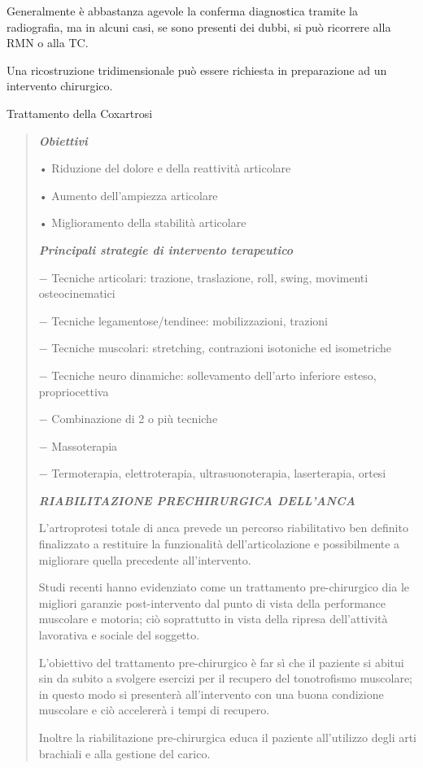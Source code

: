 \documentclass[]{article}
\begin{document}
Generalmente è abbastanza agevole la conferma diagnostica tramite la
radiografia, ma in alcuni casi, se sono presenti dei dubbi, si può
ricorrere alla RMN o alla TC.

Una ricostruzione tridimensionale può essere richiesta in preparazione
ad un intervento chirurgico.

Trattamento della Coxartrosi

\begin{quote}
\textbf{\emph{Obiettivi}}

• Riduzione del dolore e della reattività articolare

• Aumento dell'ampiezza articolare

• Miglioramento della stabilità articolare

\textbf{\emph{Principali strategie di intervento terapeutico}}

− Tecniche articolari: trazione, traslazione, roll, swing, movimenti
osteocinematici

− Tecniche legamentose/tendinee: mobilizzazioni, trazioni

− Tecniche muscolari: stretching, contrazioni isotoniche ed isometriche

− Tecniche neuro dinamiche: sollevamento dell'arto inferiore esteso,
propriocettiva

− Combinazione di 2 o più tecniche

− Massoterapia

− Termoterapia, elettroterapia, ultrasuonoterapia, laserterapia, ortesi

\textbf{\emph{RIABILITAZIONE PRECHIRURGICA DELL'ANCA }}

L'artroprotesi totale di anca prevede un percorso riabilitativo ben
definito finalizzato a restituire la funzionalità dell'articolazione e
possibilmente a migliorare quella precedente all'intervento.

Studi recenti hanno evidenziato come un trattamento pre-chirurgico dia
le migliori garanzie post-intervento dal punto di vista della
performance muscolare e motoria; ciò soprattutto in vista della ripresa
dell'attività lavorativa e sociale del soggetto.

L'obiettivo del trattamento pre-chirurgico è far sì che il paziente si
abitui sin da subito a svolgere esercizi per il recupero del
tonotrofismo muscolare; in questo modo si presenterà all'intervento con
una buona condizione muscolare e ciò accelererà i tempi di recupero.

Inoltre la riabilitazione pre-chirurgica educa il paziente all'utilizzo
degli arti brachiali e alla gestione del carico.


\end{quote}
\end{document}
